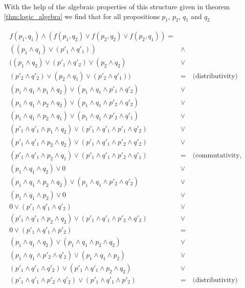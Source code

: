 With the help of the algebraic properties of this structure given in theorem \ref{thm:logic_algebra} we find that for all propositions $p_1$, $p_2$, $q_1$ and $q_2$

\begin{align}
\begin{split}
f(p_1,q_1)\wedge (f(p_1,q_2)\vee f(p_2,q_2)\vee f(p_2,q_1)) = \\
((p_1\wedge q_1)\vee (p'_1 \wedge q'_1))&\wedge \\
((p_1\wedge q_2)\vee (p'_1 \wedge q'_2)\vee(p_2\wedge q_2) &\vee \\ 
(p'_2 \wedge q'_2)\vee(p_2\wedge q_1)\vee (p'_2 \wedge q'_1))& = \quad\text{(distributivity)}  \\ 
(p_1\wedge q_1\wedge  p_1\wedge q_2)\vee (p_1\wedge q_1\wedge  p'_1 \wedge q'_2)&\vee \\
(p_1\wedge q_1\wedge  p_2\wedge q_2)\vee (p_1\wedge q_1\wedge  p'_2 \wedge q'_2)&\vee \\
(p_1\wedge q_1\wedge  p_2\wedge q_1)\vee (p_1\wedge q_1\wedge  p'_2 \wedge q'_1)&\vee \\
(p'_1\wedge q'_1\wedge  p_1\wedge q_2)\vee (p'_1\wedge q'_1\wedge  p'_1 \wedge q'_2)&\vee \\
(p'_1\wedge q'_1\wedge  p_2\wedge q_2)\vee (p'_1\wedge q'_1\wedge  p'_2 \wedge q'_2)&\vee \\
(p'_1\wedge q'_1\wedge  p_2\wedge q_1)\vee (p'_1\wedge q'_1\wedge  p'_2 \wedge q'_1)&= \quad\text{(commutativity, idempotency, complements)}\\
(p_1\wedge q_1 \wedge q_2)\vee 0 & \vee \\
(p_1\wedge q_1\wedge  p_2\wedge q_2)\vee (p_1\wedge q_1\wedge  p'_2 \wedge q'_2)&\vee \\
(p_1\wedge q_1\wedge  p_2)\vee 0 & \vee \\
0\vee (p'_1\wedge q'_1 \wedge q'_2) & \vee \\
(p'_1\wedge q'_1\wedge  p_2\wedge q_2)\vee (p'_1\wedge q'_1\wedge  p'_2 \wedge q'_2) & \vee\\
0\vee (p'_1\wedge q'_1\wedge  p'_2 )&=  \\ 
(p_1\wedge q_1 \wedge q_2)\vee(p_1\wedge q_1\wedge  p_2\wedge q_2)&\vee\\
(p_1\wedge q_1\wedge  p'_2 \wedge q'_2)\vee (p_1\wedge q_1\wedge  p_2)&\vee \\
(p'_1\wedge q'_1 \wedge q'_2)\vee (p'_1\wedge q'_1\wedge  p_2\wedge q_2)&\vee \\
(p'_1\wedge q'_1\wedge  p'_2 \wedge q'_2)\vee (p'_1\wedge q'_1\wedge  p'_2 )&= \quad\text{(distributivity)} \\

\end{split}
\end{align}
